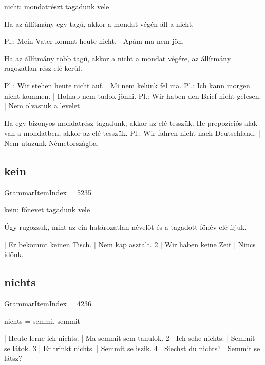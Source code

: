 \documentclass{article}
\newenvironment{desc}{\verbatim}{\endverbatim}
\newenvironment{exmp}{\verbatim}{\endverbatim}
\begin{document}
\begin{desc}
nicht: mondatrészt tagadunk vele

\begin{enumerate}
Ha az állítmány egy tagú, akkor a mondat végén áll a nicht.

Pl.: Mein Vater kommt heute nicht. | Apám ma nem jön.

Ha az állítmány több tagú, akkor a nicht a mondat végére, az állítmány ragozatlan rész elé kerül.

Pl.: Wir stehen heute nicht auf. | Mi nem kelünk fel ma.
Pl.: Ich kann morgen nicht kommen. | Holnap nem tudok jönni.
Pl.: Wir haben den Brief nicht gelesen. | Nem olvastuk a levelet.

Ha egy bizonyos mondatrész tagadunk, akkor az elé tesszük.
He prepozíciós alak van a mondatben, akkor az elé tesszük.
Pl.: Wir fahren nicht nach Deutschland. | Nem utazunk Németországba.
\end{enumerate}
\end{desc}

\subsection{kein}

GrammarItemIndex = 5235

\begin{desc}
kein: főnevet tagadunk vele

Úgy rugozzuk, mint az ein határozatlan névelőt és a tagadott főnév elé írjuk.
\end{desc}

\begin{exmp}
1 | Er bekommt keinen Tisch. | Nem kap asztalt.
2 | Wir haben keine Zeit | Nincs időnk.
\end{exmp}

\subsection{nichts}

GrammarItemIndex = 4236

\begin{desc}
nichts = semmi, semmit
\end{desc}

\begin{exmp}
1 | Heute lerne ich nichts. | Ma semmit sem tanulok.
2 | Ich sehe nichts. | Semmit se látok.
3 | Er trinkt nichts. | Semmit se iszik.
4 | Siechst du nichts? | Semmit se látsz?
\end{exmp}
\end{document}
